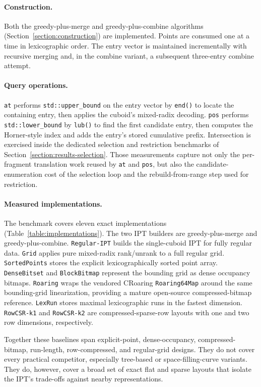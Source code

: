 \documentclass[manuscript,screen,review]{acmart}
\theoremstyle{definition}
\theoremstyle{plain}
\begin{document}
\paragraph{Construction.}
Both the greedy-plus-merge and greedy-plus-combine algorithms
(Section~\ref{section:construction}) are implemented.
Points are consumed one at a time in lexicographic order. The entry
vector is maintained incrementally with recursive merging and, in the
combine variant, a subsequent three-entry combine attempt.

\paragraph{Query operations.}
\texttt{at} performs \texttt{std::upper\_bound} on the entry vector by
\texttt{end()} to locate the containing entry, then applies the cuboid's
mixed-radix decoding.
\texttt{pos} performs \texttt{std::lower\_bound} by \texttt{lub()} to find
the first candidate entry, then computes the Horner-style index and adds
the entry's stored cumulative prefix.
Intersection is exercised inside the dedicated selection and
restriction benchmarks of
Section~\ref{section:results-selection}. Those measurements capture not
only the per-fragment translation work reused by \texttt{at} and
\texttt{pos}, but also the candidate-enumeration cost of the selection
loop and the rebuild-from-range step used for restriction.

\paragraph{Measured implementations.}
The benchmark covers eleven exact implementations
(Table~\ref{table:implementations}). The two IPT builders are
greedy-plus-merge and greedy-plus-combine. \texttt{Regular-IPT} builds
the single-cuboid IPT for fully regular data. \texttt{Grid} applies
pure mixed-radix rank/unrank to a full regular grid. \texttt{SortedPoints}
stores the explicit lexicographically sorted point array. \texttt{DenseBitset}
and \texttt{BlockBitmap} represent the bounding grid as dense occupancy
bitmaps. \texttt{Roaring} wraps the vendored CRoaring \texttt{Roaring64Map}
around the same bounding-grid linearization, providing a mature
open-source compressed-bitmap reference. \texttt{LexRun} stores maximal
lexicographic runs in the fastest dimension. \texttt{RowCSR-k1} and
\texttt{RowCSR-k2} are compressed-sparse-row layouts with one and two row
dimensions, respectively.

Together these baselines span explicit-point, dense-occupancy,
compressed-bitmap, run-length, row-compressed, and regular-grid designs.
They do not cover every practical competitor, especially tree-based or
space-filling-curve variants. They do, however, cover a broad set of
exact flat and sparse layouts that isolate the IPT's trade-offs
against nearby representations.
\end{document}
